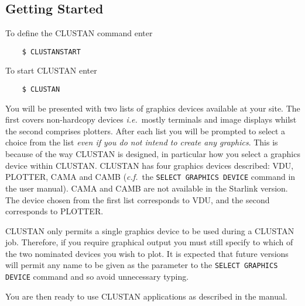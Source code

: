 \subsection{Getting Started}
To define the {\small CLUSTAN} command enter
\begin{verbatim}
    $ CLUSTANSTART
\end{verbatim}

To start {\small CLUSTAN} enter
\begin{verbatim}
    $ CLUSTAN
\end{verbatim}
You will be presented with two lists of graphics devices available at
your site.  The first covers non-hardcopy devices  {\it i.e.}\ mostly
terminals and image displays whilst the second comprises plotters. After each
list you will be prompted to select a choice from the list {\em even
if you do not intend to create any graphics}.  This is because of
the way {\small CLUSTAN} is designed, in particular how you select a graphics
device within {\small CLUSTAN}.  {\small CLUSTAN} has four graphics devices
described:
VDU, PLOTTER, CAMA and CAMB ({\it c.f.}\ the {\tt SELECT GRAPHICS DEVICE}
command in the user manual).  CAMA and CAMB are not available in the
Starlink version.  The device chosen from the first list corresponds
to VDU, and the second corresponds to PLOTTER.

{\small CLUSTAN} only permits a single graphics device to be used during a
{\small CLUSTAN} job.  Therefore, if you require graphical output you must still
specify to which of the two nominated devices you wish to plot.  It is
expected that future versions will permit any name to be given as the
parameter to the {\tt SELECT GRAPHICS DEVICE} command and so avoid
unnecessary typing.

You are then ready to use {\small CLUSTAN} applications as described in the
manual.

